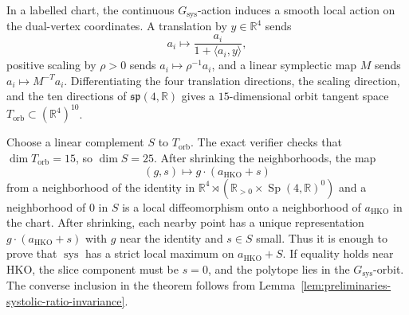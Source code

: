In a labelled chart, the continuous \(G_{\operatorname{sys}}\)-action induces
a smooth local action on the dual-vertex coordinates. A translation by
\(y\in\mathbb R^4\) sends
\[
  a_i\mapsto \frac{a_i}{1+\langle a_i,y\rangle},
\]
positive scaling by \(\rho>0\) sends \(a_i\mapsto \rho^{-1}a_i\), and a
linear symplectic map \(M\) sends \(a_i\mapsto M^{-T}a_i\). Differentiating
the four translation directions, the scaling direction, and the ten directions
of \(\mathfrak{sp}(4,\mathbb R)\) gives a \(15\)-dimensional orbit tangent
space \(T_{\mathrm{orb}}\subset(\mathbb R^4)^{10}\).

Choose a linear complement \(S\) to \(T_{\mathrm{orb}}\). The exact verifier
checks that \(\dim T_{\mathrm{orb}}=15\), so \(\dim S=25\). After shrinking the
neighborhoods, the map
\[
  (g,s)\longmapsto g\cdot(a_{\mathrm{HKO}}+s)
\]
from a neighborhood of the identity in
\(\mathbb R^4\rtimes(\mathbb R_{>0}\times
\operatorname{Sp}(4,\mathbb R)^0)\) and a
neighborhood of \(0\) in \(S\) is a local diffeomorphism onto a neighborhood of
\(a_{\mathrm{HKO}}\) in the chart. After shrinking, each nearby point has a
unique representation \(g\cdot(a_{\mathrm{HKO}}+s)\) with \(g\) near the
identity and \(s\in S\) small. Thus it is enough to prove that
\(\operatorname{sys}\) has a strict local maximum on \(a_{\mathrm{HKO}}+S\). If
equality holds near HKO, the slice component must be \(s=0\), and the polytope
lies in the \(G_{\operatorname{sys}}\)-orbit. The converse inclusion in the
theorem follows from
Lemma~\ref{lem:preliminaries-systolic-ratio-invariance}.
